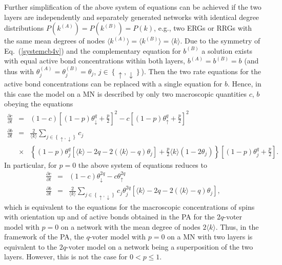 \documentclass[11pt]{article}
\begin{document}
Further simplification of the above system of equations
can be achieved if the two layers are independently and separately generated
networks with identical degree distributions $P\left( k^{(A)}\right) =P\left( k^{(B)}\right) = P(k)$, 
e.g., two ERGs or RRGs with the same mean degrees of nodes
$\langle k^{(A)} \rangle = \langle k^{(B)}\rangle = \langle k\rangle$. Due to the symmetry of Eq.\ (\ref{systemcb4v}) and
the complementary equation for $b^{(B)}$ a solution exists with equal active bond concentrations within both layers,
$b^{(A)}=b^{(B)} =b$ (and thus with $\theta_{j}^{(A)} =\theta_{j}^{(B)} =\theta_{j}$, 
$j\in \left\{ \uparrow,\downarrow\right\}$). 
Then the two rate equations for the active bond concentrations can be replaced with a single equation for $b$.
Hence, in this case the model on a MN is described by only two macroscopic 
quantities $c$, $b$ obeying the equations
\begin{eqnarray}
\frac{\partial c}{\partial t} &=&(1-c) \left[ (1-p)\theta_{\downarrow}^{q} +\frac{p}{2}\right]^2 -
c\left[ (1-p)\theta_{\uparrow}^{q} +\frac{p}{2}\right]^2 \\
\frac{\partial b}{\partial t} &=& \frac{2}{\langle k\rangle} \sum_{j\in \left\{ \uparrow,\downarrow\right\}} c_{j} \nonumber\\
& \times&  
 \left\{ (1-p) \theta_{j}^{q}
\left[  \langle k\rangle-2q -2 \left( \langle k\rangle -q\right) \theta_{j} \right]
+\frac{p}{2}\langle k\rangle \left(1-2 \theta_{j}\right) \right\}
 \left[ (1-p) \theta_{j}^{q} +\frac{p}{2}\right].
\end{eqnarray}
In particular, for $p=0$ the above system of equations reduces to
\begin{eqnarray}
\frac{\partial c}{\partial t} &=&(1-c) \theta_{\downarrow}^{2q} - c \theta_{\uparrow}^{2q}\\
\frac{\partial b}{\partial t} &=& \frac{2}{\langle k\rangle} \sum_{j\in \left\{ \uparrow,\downarrow\right\}} c_{j} 
\theta_{j}^{2q}
\left[  \langle k\rangle-2q -2 \left( \langle k\rangle -q\right) \theta_{j} \right],
\end{eqnarray}
which is equivalent to the equations for the macroscopic concentrations of spins with orientation up and of active bonds
obtained in the PA for the $2q$-voter model with $p=0$ on a network with the mean degree of nodes $2 \langle k\rangle$.
Thus, in the framework of the PA, the $q$-voter model with $p=0$ on a MN with two layers is equivalent to 
the $2q$-voter model on a network being a superposition of the two layers. However, this is not the case for $0<p \le 1$.
\end{document}
